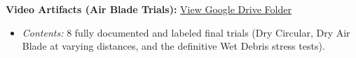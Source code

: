 \documentclass{article}
\begin{document}
\vspace{0.5cm}
\noindent
\textbf{Video Artifacts (Air Blade Trials):} \href{https://drive.google.com/drive/folders/1RAJA95EF-XjMrkhjWkuoIBbONH_DbRVu?usp=drive_link}{View Google Drive Folder}
\begin{itemize}
    \item \textit{Contents:} 8 fully documented and labeled final trials (Dry Circular, Dry Air Blade at varying distances, and the definitive Wet Debris stress tests).
\end{itemize}
\end{document}
